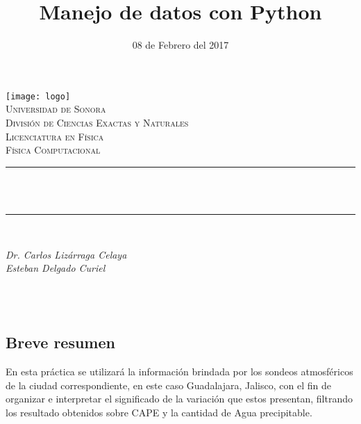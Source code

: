 \documentclass[12pt]{article}
\title{Manejo de datos con Python}	%
\date{08 de Febrero del 2017} %
\makeatletter
\let\thetitle\@title
\let\thedate\@date
\makeatother
\begin{document}

\begin{titlepage}
	\centering
    \vspace*{0.5 cm}
    \texttt{[image: logo]}\\[0.5 cm]	%
    \textsc{\Large Universidad de Sonora}\\[0.5 cm]	%
	\textsc{\Large División de Ciencias Exactas y Naturales}\\[0.5 cm]				%
    \textsc{\Large Licenciatura en Física}\\[0.5 cm]	%
	\textsc{\large Física Computacional}\\[0.5 cm]	%
	\rule{\linewidth}{0.2 mm} \\[0.4 cm]
	{ \huge \bfseries \thetitle}\\
	\rule{\linewidth}{0.2 mm} \\[0.5 cm]
	
	\begin{minipage}{\textwidth}
		\begin{centering} 
			\emph{\Large  Dr. Carlos Lizárraga Celaya \\
            \vspace{0.5cm} Esteban Delgado Curiel} \\
			\end{centering}
            
	\end{minipage}\\[1 cm]
	{\large \thedate}\\[2 cm]
 
	\vfill
	
\end{titlepage}


\begin{center}
\section*{Breve resumen}
\end{center}
En esta práctica se utilizará la información brindada por los sondeos atmosféricos de la ciudad correspondiente, en este caso Guadalajara, Jalisco, con el fin de organizar e interpretar el significado de la variación que estos presentan, filtrando los resultado obtenidos sobre CAPE y la cantidad de Agua precipitable.
\end{document}
